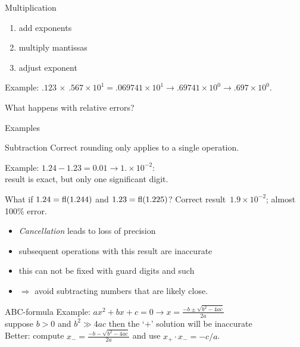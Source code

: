 \begin{numberedframe}{Multiplication}
  \begin{enumerate}
  \item add exponents
  \item multiply mantissas
  \item adjust exponent
  \end{enumerate}

Example: $.123\,\times\,.567\times10^1=.069741\times10^1\rightarrow
.69741\times10^0\rightarrow.697\times10^0$.

What happens with relative errors?
\end{numberedframe}

 {Examples}

\begin{numberedframe}{Subtraction}
Correct rounding only applies to a single operation.

Example: $1.24-1.23=0.01\rightarrow 1.\times 10^{-2}$:\\
result is exact, but only one significant digit.

What if $1.24=\mathop{\mathrm{fl}}(1.244)$ and $1.23=\mathop{\mathrm{fl}}(1.225)$? Correct
result~$1.9\times 10^{-2}$; almost 100\% error.
\begin{itemize}
\item \emph{Cancellation} leads to loss of precision
\item subsequent operations with this result are inaccurate
\item this can not be fixed with guard digits and such
\item $\Rightarrow$ avoid subtracting numbers that are likely close.
\end{itemize}
\end{numberedframe}

\begin{numberedframe}{ABC-formula}
  Example: $ax^2+bx+c=0\rightarrow x=\frac{-b\pm\sqrt{b^2-4ac}}{2a}$\\
  suppose $b>0$ and $b^2\gg 4ac$ then the `$+$' solution will be
  inaccurate\\
  Better: compute $x_-=\frac{-b-\sqrt{b^2-4ac}}{2a}$ and use $x_+\cdot
  x_-=-c/a$.
\end{numberedframe}

